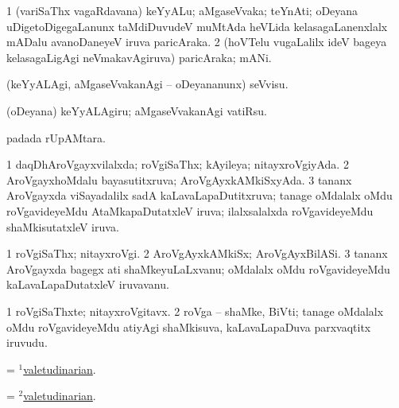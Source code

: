 \bentry
{} 
\gl{\nA}
\expl{}
\bmng
\bnum
\num{1} (variSaThx vagaRdavana) keYyALu; aMgaseVvaka; teYnAti; oDeyana uDigetoDigegaLanunx taMdiDuvudeV muMtAda heVLida kelasagaLanenxlalx mADalu avanoDaneyeV iruva paricAraka. 
\num{2} (hoVTelu \mo vugaLalilx ideV bageya kelasagaLigAgi neVmakavAgiruva) paricAraka; mANi. 
\enum
\emng
\eentry

\bentry
{} 
\gl{\kirx}


\noindent
\gl{\sakirx}
\expl{}
\bmng
 (keYyALAgi, aMgaseVvakanAgi -- oDeyananunx) seVvisu. 
\emng

\noindent 
\gl{\akirx}
\expl{}
\bmng
 (oDeyana) keYyALAgiru; aMgaseVvakanAgi vatiRsu. 
\emng
\eentry

\bentry
{} 
\gl{\nA}
\expl{}
\bmng
  padada rUpAMtara. 
\emng
\eentry

\bentry
{} 
\gl{\gu}
\expl{}
\bmng
\bnum
\num{1} daqDhAroVgayxvilalxda; roVgiSaThx; kAyileya; nitayxroVgiyAda. 
\num{2} AroVgayxhoMdalu bayasutitxruva; AroVgAyxkAMkiSxyAda. 
\num{3} tananx AroVgayxda viSayadalilx sadA kaLavaLapaDutitxruva; tanage oMdalalx oMdu roVgavideyeMdu AtaMkapaDutatxleV iruva; ilalxsalalxda roVgavideyeMdu shaMkisutatxleV iruva. 
\enum
\emng
\eentry

\bentry
{} 
\gl{\nA}
\expl{}
\bmng
\bnum
\num{1} roVgiSaThx; nitayxroVgi. 
\num{2} AroVgAyxkAMkiSx; AroVgAyxBilASi. 
\num{3} tananx AroVgayxda bagegx ati shaMkeyuLaLxvanu; oMdalalx oMdu roVgavideyeMdu kaLavaLapaDutatxleV iruvavanu. 
\enum
\emng
\eentry

\bentry
{} 
\gl{\nA}
\expl{}
\bmng
\bnum
\num{1} roVgiSaThxte; nitayxroVgitavx. 
\num{2} roVga -- shaMke, BiVti; tanage oMdalalx oMdu roVgavideyeMdu atiyAgi shaMkisuva, kaLavaLapaDuva parxvaqtitx iruvudu. 
\enum
\emng
\eentry

\bentry
{} 
\gl{\gu}
\expl{}
\bmng
= \hyperlink{valetudinarian(1)}{$^1$valetudinarian}. 
\emng
\eentry

\bentry
{} 
\gl{\nA}
\bmng
= \hyperlink{valetudinarian(2)}{$^2$valetudinarian}. 
\emng
\eentry

